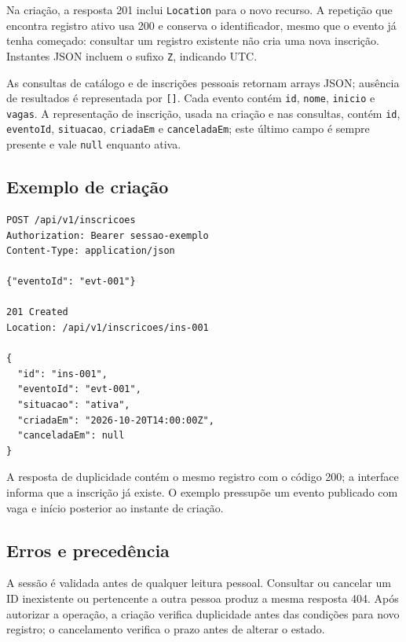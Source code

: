 Na criação, a resposta 201 inclui \texttt{Location} para o novo recurso. A
repetição que encontra registro ativo usa 200 e conserva o identificador,
mesmo que o evento já tenha começado: consultar um registro existente não cria
uma nova inscrição. Instantes JSON incluem o sufixo \texttt{Z}, indicando UTC.

As consultas de catálogo e de inscrições pessoais retornam arrays JSON; ausência
de resultados é representada por \texttt{[]}. Cada evento contém \texttt{id},
\texttt{nome}, \texttt{inicio} e \texttt{vagas}. A representação de inscrição,
usada na criação e nas consultas, contém \texttt{id}, \texttt{eventoId},
\texttt{situacao}, \texttt{criadaEm} e \texttt{canceladaEm}; este último campo
é sempre presente e vale \texttt{null} enquanto ativa.

\subsection{Exemplo de criação}
\begin{verbatim}
POST /api/v1/inscricoes
Authorization: Bearer sessao-exemplo
Content-Type: application/json

{"eventoId": "evt-001"}

201 Created
Location: /api/v1/inscricoes/ins-001

{
  "id": "ins-001",
  "eventoId": "evt-001",
  "situacao": "ativa",
  "criadaEm": "2026-10-20T14:00:00Z",
  "canceladaEm": null
}
\end{verbatim}

A resposta de duplicidade contém o mesmo registro com o código 200; a interface
informa que a inscrição já existe. O exemplo pressupõe um evento publicado com
vaga e início posterior ao instante de criação.

\subsection{Erros e precedência}
A sessão é validada antes de qualquer leitura pessoal. Consultar ou cancelar
um ID inexistente ou pertencente a outra pessoa produz a mesma resposta 404.
Após autorizar a operação, a criação verifica duplicidade antes das condições
para novo registro; o cancelamento verifica o prazo antes de alterar o estado.

